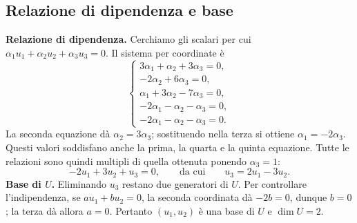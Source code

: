 \subsection{Relazione di dipendenza e base}
\begin{svolgimento}
\textbf{Relazione di dipendenza.} Cerchiamo gli scalari per cui $\alpha_1u_1+\alpha_2u_2+\alpha_3u_3=0$. Il sistema per coordinate è
\[
  \begin{cases}
    3\alpha_1+\alpha_2+3\alpha_3=0,\\
    -2\alpha_2+6\alpha_3=0,\\
    \alpha_1+3\alpha_2-7\alpha_3=0,\\
    -2\alpha_1-\alpha_2-\alpha_3=0,\\
    -2\alpha_1-\alpha_2-\alpha_3=0.
  \end{cases}
\]
La seconda equazione dà $\alpha_2=3\alpha_3$; sostituendo nella terza si ottiene $\alpha_1=-2\alpha_3$. Questi valori soddisfano anche la prima, la quarta e la quinta equazione. Tutte le relazioni sono quindi multipli di quella ottenuta ponendo $\alpha_3=1$:
\[
  -2u_1+3u_2+u_3=0,
  \qquad\text{da cui}\qquad u_3=2u_1-3u_2.
\]
\textbf{Base di $U$.} Eliminando $u_3$ restano due generatori di $U$. Per controllare l'indipendenza, se $au_1+bu_2=0$, la seconda coordinata dà $-2b=0$, dunque $b=0$; la terza dà allora $a=0$. Pertanto $(u_1,u_2)$ è una base di $U$ e $\dim U=2$.
\end{svolgimento}

